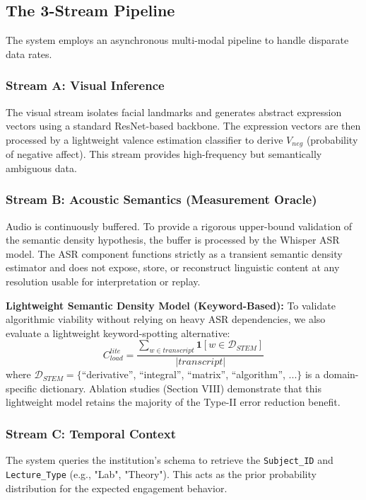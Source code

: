\documentclass[conference]{IEEEtran}
\begin{document}
\subsection{The 3-Stream Pipeline}
The system employs an asynchronous multi-modal pipeline to handle disparate data rates.

\subsubsection{Stream A: Visual Inference}
The visual stream isolates facial landmarks and generates abstract expression vectors using a standard ResNet-based backbone. The expression vectors are then processed by a lightweight valence estimation classifier to derive $V_{neg}$ (probability of negative affect). This stream provides high-frequency but semantically ambiguous data.

\subsubsection{Stream B: Acoustic Semantics (Measurement Oracle)}
Audio is continuously buffered. To provide a rigorous upper-bound validation of the semantic density hypothesis, the buffer is processed by the Whisper ASR model. The ASR component functions strictly as a transient semantic density estimator and does not expose, store, or reconstruct linguistic content at any resolution usable for interpretation or replay.

\textbf{Lightweight Semantic Density Model (Keyword-Based):}
To validate algorithmic viability without relying on heavy ASR dependencies, we also evaluate a lightweight keyword-spotting alternative:
\begin{equation}
C_{load}^{lite} = \frac{\sum_{w \in transcript} \mathbf{1}[w \in \mathcal{D}_{STEM}]}{|transcript|}
\end{equation}
where $\mathcal{D}_{STEM} = \{$``derivative'', ``integral'', ``matrix'', ``algorithm'', ...$\}$ is a domain-specific dictionary. Ablation studies (Section VIII) demonstrate that this lightweight model retains the majority of the Type-II error reduction benefit.

\subsubsection{Stream C: Temporal Context}
The system queries the institution's schema to retrieve the \texttt{Subject\_ID} and \texttt{Lecture\_Type} (e.g., "Lab", "Theory"). This acts as the prior probability distribution for the expected engagement behavior.
\end{document}
